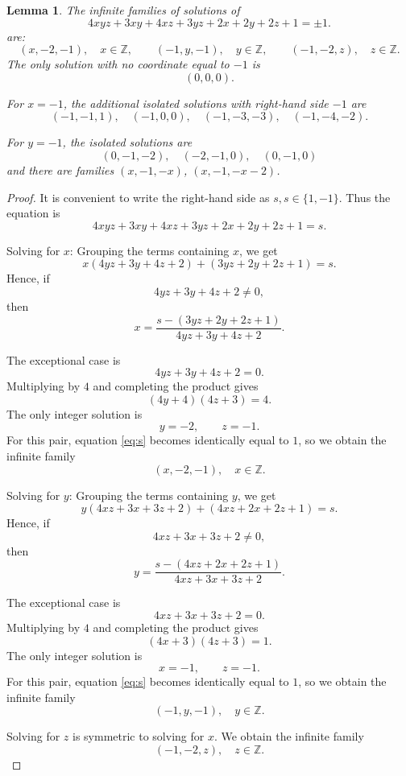 \documentclass{article}
\newtheorem{lm}[theorem]{Lemma}
\begin{document}
\begin{lm}
The infinite families of solutions of \begin{equation}\label{eq:main}
4xyz+3xy+4xz+3yz+2x+2y+2z+1=\pm 1.
\end{equation} are:
\[
{(x,-2,-1),\quad x\in\mathbb Z,}\qquad
{(-1,y,-1),\quad y\in\mathbb Z,}\qquad
{(-1,-2,z),\quad z\in\mathbb Z.}
\]
 The only solution with no coordinate equal to $-1$ is
\[
{(0,0,0)}.
\]


For $x=-1$, the additional isolated solutions with right-hand side $-1$ are
\[
{(-1,-1,1),\quad (-1,0,0),\quad (-1,-3,-3),\quad (-1,-4,-2)}.
\]

For $y=-1$, the isolated solutions are
\[
{(0,-1,-2),\quad (-2,-1,0),\quad (0,-1,0)} 
\] and there are families $(x,-1,-x)$, $(x,-1,-x-2)$.
\end{lm}
\begin{proof}It is convenient to write the right-hand side as
$
s,  s\in\{1,-1\}.
$
Thus the equation is
\begin{equation}\label{eq:s}
4xyz+3xy+4xz+3yz+2x+2y+2z+1=s.
\end{equation}



{Solving for $x$:}
Grouping the terms containing $x$, we get
\[
x(4yz+3y+4z+2)+(3yz+2y+2z+1)=s.
\]
Hence, if
\[
4yz+3y+4z+2\neq 0,
\]
then
\[
{
 x=\frac{s-(3yz+2y+2z+1)}{4yz+3y+4z+2}
}.
\]

The exceptional case is
\[
4yz+3y+4z+2=0.
\]
Multiplying by $4$ and completing the product gives
\[
(4y+4)(4z+3)=4.
\]
The only integer solution is
\[
y=-2,\qquad z=-1.
\]
For this pair, equation \eqref{eq:s} becomes identically equal to $1$, so we obtain the infinite family
\[
{(x,-2,-1),\quad x\in\mathbb Z}.
\]

{Solving for $y$:}
Grouping the terms containing $y$, we get
\[
y(4xz+3x+3z+2)+(4xz+2x+2z+1)=s.
\]
Hence, if
\[
4xz+3x+3z+2\neq 0,
\]
then
\[
{
 y=\frac{s-(4xz+2x+2z+1)}{4xz+3x+3z+2}
}.
\]

The exceptional case is
\[
4xz+3x+3z+2=0.
\]
Multiplying by $4$ and completing the product gives
\[
(4x+3)(4z+3)=1.
\]
The only integer solution is
\[
x=-1,
\qquad
z=-1.
\]
For this pair, equation \eqref{eq:s} becomes identically equal to $1$, so we obtain the infinite family
\[
{(-1,y,-1),\quad y\in\mathbb Z}.
\]

Solving for $z$ is symmetric to solving for $x$.
We obtain the infinite family
\[
{(-1,-2,z),\quad z\in\mathbb Z}.
\]




\end{proof}
\end{document}
